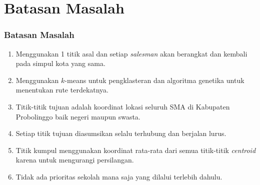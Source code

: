 \section{Batasan Masalah}
\begin{frame}
\frametitle{Batasan Masalah}
\begin{block}{}
\begin{enumerate}
\item Menggunakan 1 titik asal dan setiap \textit{salesman} akan berangkat dan kembali pada simpul kota yang sama.
\item Menggunakan $k$-means untuk pengklasteran dan algoritma genetika untuk menentukan rute terdekatnya.
\item Titik-titik tujuan adalah koordinat lokasi seluruh SMA di Kabupaten Probolinggo baik negeri maupun swasta.
\item Setiap titik tujuan diasumsikan selalu terhubung dan berjalan lurus.
\item Titik kumpul menggunakan koordinat rata-rata dari semua titik-titik \textit{centroid} karena untuk mengurangi persilangan.
\item Tidak ada prioritas sekolah mana saja yang dilalui terlebih dahulu.
\end{enumerate}
\end{block}
\end{frame}